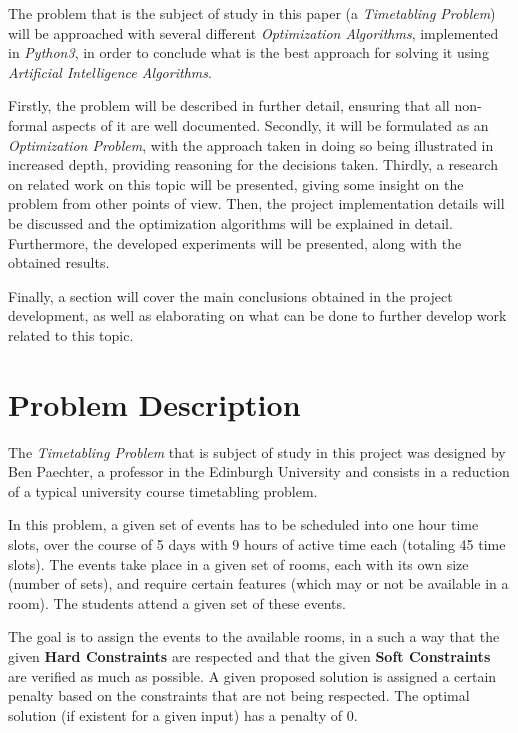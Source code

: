 \documentclass[conference]{IEEEtran}
\begin{document}
The problem that is the subject of study in this paper (a \textit{Timetabling Problem}) will be approached with several different \textit{Optimization Algorithms}, implemented in \textit{Python3}, in order to conclude what is the best approach for solving it using \textit{Artificial Intelligence Algorithms}.

Firstly, the problem will be described in further detail, ensuring that all non-formal aspects of it are well documented. Secondly, it will be formulated as an \textit{Optimization Problem}, with the approach taken in doing so being illustrated in increased depth, providing reasoning for the decisions taken. Thirdly, a research on related work on this topic will be presented, giving some insight on the problem from other points of view. Then, the project implementation details will be discussed and the optimization algorithms will be explained in detail. Furthermore, the developed experiments will be presented, along with the obtained results.

Finally, a section will cover the main conclusions obtained in the project development, as well as elaborating on what can be done to further develop work related to this topic.

\section{Problem Description}

The \textit{Timetabling Problem} that is subject of study in this project was designed by Ben Paechter, a professor in the Edinburgh University and consists in a reduction of a typical university course timetabling problem.

In this problem, a given set of events has to be scheduled into one hour time slots, over the course of 5 days with 9 hours of active time each (totaling 45 time slots). The events take place in a given set of rooms, each with its own size (number of sets), and require certain features (which may or not be available in a room). The students attend a given set of these events. 

The goal is to assign the events to the available rooms, in a such a way that the given \textbf{Hard Constraints} are respected and that the given \textbf{Soft Constraints} are verified as much as possible. A given proposed solution is assigned a certain penalty based on the constraints that are not being respected. The optimal solution (if existent for a given input) has a penalty of 0.
\end{document}
